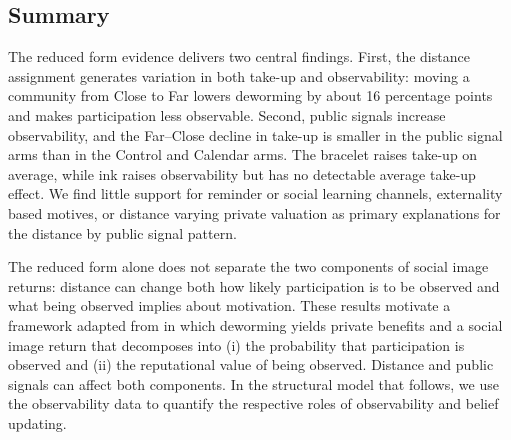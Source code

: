 \documentclass[ECM\space ReStud.tex]{subfiles}
\begin{document}

\subsection{Summary}

The reduced form evidence delivers two central findings. First, the distance assignment generates variation in both take-up and observability: moving a community from Close to Far lowers deworming by about 16 percentage points and makes participation less observable. Second, public signals increase observability, and the Far--Close decline in take-up is smaller in the public signal arms than in the Control and Calendar arms. The bracelet raises take-up on average, while ink raises observability but has no detectable average take-up effect. We find little support for reminder or social learning channels, externality based motives, or distance varying private valuation as primary explanations for the distance by public signal pattern.

The reduced form alone does not separate the two components of social image returns: distance can change both how likely participation is to be observed and what being observed implies about motivation. These results motivate a framework adapted from \citet{Benabou_laws_2011} in which deworming yields private benefits and a social image return that decomposes into (i) the probability that participation is observed and (ii) the reputational value of being observed. Distance and public signals can affect both components. In the structural model that follows, we use the observability data to quantify the respective roles of observability and belief updating.
\end{document}
